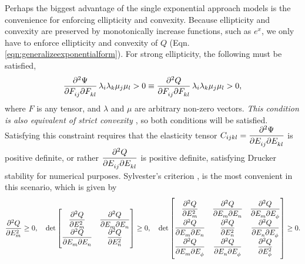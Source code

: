 	Perhaps the biggest advantage of the single exponential approach models is the convenience for enforcing ellipticity and convexity. Because ellipticity and convexity are preserved by monotonically increase functions, such as $e^x$, we only have to enforce ellipticity and convexity of $Q$ (Eqn. \ref{eqn:generalizeexponentialform}). For strong ellipticity, the following must be satisfied,
\begin{equation}\label{eqn:strongellipticity}
\dmd{\Psi}{2}{F_{ij}}{}{F_{kl}}{}\lambda_i\lambda_k\mu_j\mu_l > 0 \equiv \dmd{Q}{2}{F_{ij}}{}{F_{kl}}{}\lambda_i\lambda_k\mu_j\mu_l > 0,
\end{equation}
	where $F$ is any tensor, and $\lambda$ and $\mu$ are arbitrary non-zero vectors. \emph{This condition is also equivalent of strict convexity \cite{ball_strict_1980}}, so both conditions will be satisfied. Satisfying this constraint requires that the elasticity tensor $C_{ijkl}=\dmd{\Psi}{2}{E_{ij}}{}{E_{kl}}{}$ is positive definite, or rather $\dmd{Q}{2}{E_{ij}}{}{E_{kl}}{}$ is positive definite, satisfying Drucker stability for numerical purposes. Sylvester's criterion \cite{gilbert_positive_1991}, is the most convenient in this scenario, which is given by 
\begin{equation}\label{eqn:convexitycriteria}
\begin{aligned}
\dpd[2]{Q}{E_m} \geq 0, \quad
\det
\begin{bmatrix}
\dpd[2]{Q}{E_m} & \dmd{Q}{2}{E_m}{}{E_n}{}\\
\dmd{Q}{2}{E_m}{}{E_n}{} & \dpd[2]{Q}{E_n}\\
\end{bmatrix} \geq0, \quad
\det
\begin{bmatrix}
\dpd[2]{Q}{E_m} & \dmd{Q}{2}{E_m}{}{E_n}{} & \dmd{Q}{2}{E_m}{}{E_\phi}{}\\
\dmd{Q}{2}{E_m}{}{E_n}{} & \dpd[2]{Q}{E_n} & \dmd{Q}{2}{E_n}{}{E_\phi}{}\\
\dmd{Q}{2}{E_m}{}{E_\phi}{} & \dmd{Q}{2}{E_n}{}{E_\phi}{} & \dpd[2]{Q}{E_\phi} \\
\end{bmatrix} \geq0.
\end{aligned}
\end{equation}

